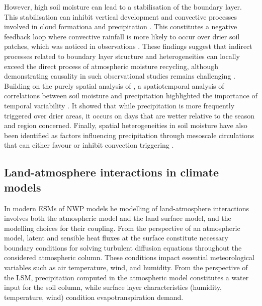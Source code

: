 However, high soil moisture can lead to a stabilisation of the boundary layer. %
This stabilisation can inhibit vertical development and convective processes involved in cloud formationa and precipitation \citep{findell_atmospheric_2003-1, ek_influence_2004}. 
This constitutes a negative feedback loop where convective rainfall is more likely to occur over drier soil patches, which was noticed in observations \citep{taylor_afternoon_2012, klein_dry_2020}. These findings suggest that indirect processes related to boundary layer structure and heterogeneities can locally exceed the direct process of atmospheric moisture recycling, although demonstrating causality in such observational studies remains challenging \citep{salvucci_investigating_2002, guillod_land-surface_2014}. Building on the purely spatial analysis of \citet{taylor_afternoon_2012}, a spatiotemporal analysis of correlations between soil moisture and precipitation highlighted the importance of temporal variability \citep{guillod_reconciling_2015}. It showed that while precipitation is more frequently triggered over drier areas, it occurs on days that are wetter relative to the season and region concerned.
Finally, spatial heterogeneities in soil moisture have also been identified as factors influencing precipitation through mesoscale circulations that can either favour or inhibit convection triggering \citep{findell_atmospheric_2003, taylor_frequency_2011, rochetin_morphology_2017}.

\subsection{Land-atmosphere interactions in climate models}

In modern ESMs of NWP models %
he modelling of land-atmosphere interactions involves both the atmospheric model and the land surface model, and the modelling choices for their coupling.
From the perspective of an atmospheric model, latent and sensible heat fluxes at the surface constitute necessary boundary conditions for solving turbulent diffusion equations throughout the considered atmospheric column. These conditions impact essential meteorological variables such as air temperature, wind, and humidity. From the perspective of the LSM, precipitation computed in the atmospheric model constitutes a water input for the soil column, while surface layer characteristics (humidity, temperature, wind) condition evapotranspiration demand.

